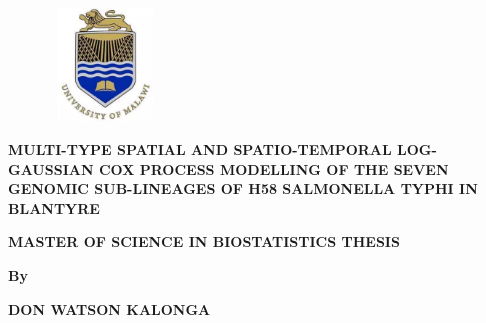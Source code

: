 \documentclass[12pt,a4paper]{report}
\begin{document}
\newpage

\thispagestyle{empty}
	
		
		
		
		\begin{figure}[h]
			\begin{center}
				\includegraphics[width = 30mm, height = 30mm]{Unima_Logo.png}
			\end{center}
		\end{figure}
		
		
		\begin{large}
			\begin{center}
				\textbf{MULTI-TYPE SPATIAL AND SPATIO-TEMPORAL LOG-GAUSSIAN COX PROCESS MODELLING 
					OF THE SEVEN GENOMIC SUB-LINEAGES OF H58 SALMONELLA TYPHI 
					IN BLANTYRE} 
			\end{center}
		\end{large}
		\par \bigskip 
		
		
		\begin{large}
			\begin{center}
				\bf{MASTER OF SCIENCE IN BIOSTATISTICS THESIS}\\
			\end{center}
		\end{large}
		
		\par \bigskip   
		
		\begin{large}
			\begin{center}
				\bf{By}\\
			\end{center}
		\end{large}
		
		\par   
		
		\begin{large}
			\begin{center}
				\bf{DON WATSON KALONGA}\\
			\end{center}
		\end{large}
		
\end{document}
